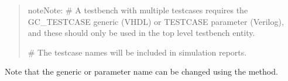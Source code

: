 \documentclass[letterpaper,10pt,english]{sphinxmanual}
\begin{document}
\begin{quote}
\begin{sphinxVerbatim}[commandchars=\\\{\}]
\end{sphinxVerbatim}

\begin{sphinxadmonition}{note}{Note:}
\sphinxAtStartPar
\# A testbench with multiple testcases requires the GC\_TESTCASE generic (VHDL) or TESTCASE parameter
(Verilog), and these should only be used in the top level testbench entity.

\sphinxAtStartPar
\# The testcase names will be included in simulation reports.
\end{sphinxadmonition}

\begin{sphinxVerbatim}[commandchars=\\\{\}]
\end{sphinxVerbatim}
\end{quote}

\sphinxAtStartPar
Note that the  generic or  parameter name can be changed using
the {\hyperref[\detokenize{api:set-testcase-identifier-name}]{}} method.
\end{document}
